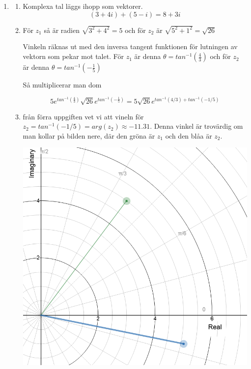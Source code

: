\documentclass[a4paper,12pt]{article}
\begin{document}
\begin{enumerate}
    \item \begin{enumerate}
              \item Komplexa tal läggs ihopp som vektorer.
                    $$(3+4i)+(5-i)=8+3i$$
              \item För $z_1$ så är radien $\sqrt{3^2+4^2}=5$ och för
                    $z_2$ är $\sqrt{5^2+1^2}=\sqrt{26}$

                    Vinkeln räknas ut med den inversa tangent funktionen
                    för lutningen av vektorn som pekar mot talet.
                    För $z_1$ är denna $\theta = tan^{-1}(\frac{4}{3})$
                    och för $z_2$ är denna $\theta = tan^{-1}(-\frac{1}{5})$

                  Så multiplicerar man dom

                  $$5e^{tan^{-1}(\frac{4}{3})}\sqrt{26}e^{tan^{-1}(-\frac{1}{5})}=5\sqrt{26}e^{tan^{-1}(4/3)+tan^{-1}(-1/5)}$$

                  \item från förra uppgiften vet vi att vineln för $z_2=tan^{-1}(-1/5)=arg(z_2)\approx -11.31$.
                  Denna vinkel är trovärdig om man kollar på bilden nere, där
                  den gröna är $z_1$ och den blåa är $z_2$.
                  
                  \begin{center}
                        \includegraphics[scale=0.5]{Figur 1.png}
                  \end{center}


\end{enumerate}
\end{enumerate}
\end{document}
